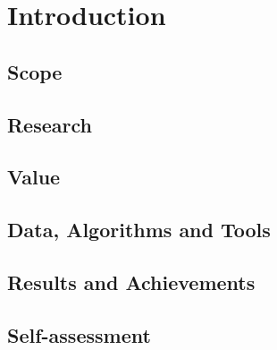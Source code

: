 \chapter{Introduction}
\label{chapterlabel1}

\section{Scope}

\blindtext

\section{Research}

\blindtext

\section{Value}

\blindtext

\section{Data, Algorithms and Tools}

\blindtext

\section{Results and Achievements}

\blindtext

\section{Self-assessment}

\blindtext